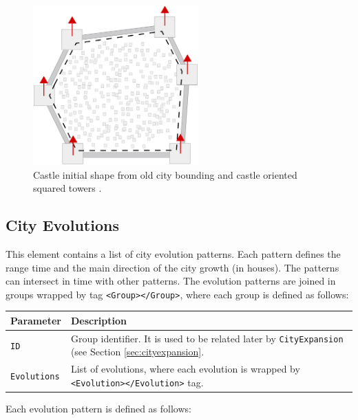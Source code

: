 \documentclass[tog]{acmsiggraph}
\begin{document}
\begin{figure}[ht]
  \centering
  \includegraphics[width=2.5in]{figs/cityevolution_castle}
  \caption{Castle initial shape from old city bounding and castle oriented squared towers .}
  \label{fig:cityevolution_castle}
\end{figure}


 

 
\subsection{City Evolutions}
\label{sec:cityevolutions}
 
 This element contains a list of city evolution patterns. Each pattern defines the range time and the main direction of the city growth (in houses).
 The patterns can intersect in time with other patterns. 
 The evolution patterns are joined in groups wrapped by tag \texttt{<Group></Group>}, where each group is defined as follows:
 
 \begin{tabularx}{0.48\textwidth}{ |l|X| }
\hline 
\textbf{Parameter} & \textbf{Description} \\[0.15cm]
 \hline
  \texttt{ID} & Group identifier. It is used to be related later by \texttt{CityExpansion} (see Section \ref{sec:cityexpansion}.\\
  \hline
  \texttt{Evolutions} & List of evolutions, where each evolution is wrapped by \texttt{<Evolution></Evolution>} tag.\\
 \hline
\end{tabularx} 

 Each evolution pattern is defined as follows:
 
\end{document}

